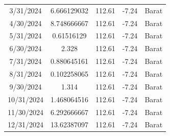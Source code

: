 \begin{longtable}{|c|c|c|c|c|}
    3/31/2024  & 6.666129032   & 112.61 & -7.24 & Barat \\
    4/30/2024  & 8.748666667   & 112.61 & -7.24 & Barat \\
    5/31/2024  & 0.61516129    & 112.61 & -7.24 & Barat \\
    6/30/2024  & 2.328         & 112.61 & -7.24 & Barat \\
    7/31/2024  & 0.880645161   & 112.61 & -7.24 & Barat \\
    8/31/2024  & 0.102258065   & 112.61 & -7.24 & Barat \\
    9/30/2024  & 1.314         & 112.61 & -7.24 & Barat \\
    10/31/2024 & 1.468064516   & 112.61 & -7.24 & Barat \\
    11/30/2024 & 6.292666667   & 112.61 & -7.24 & Barat \\
    12/31/2024 & 13.62387097   & 112.61 & -7.24 & Barat \\
    \hline


\end{longtable}
